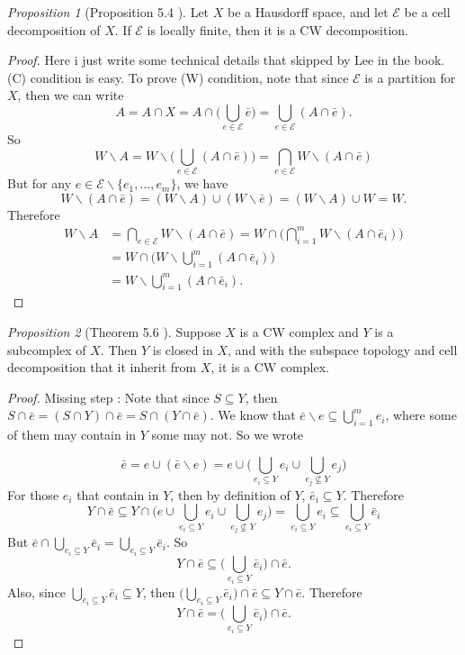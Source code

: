 \documentclass[a4paper]{article}
\theoremstyle{remark}
\newtheorem{prop}{Proposition}
\newcommand{\subhim}{\subseteq} %
\begin{document}
\begin{prop}[Proposition 5.4 \cite{LeeTM}]
	Let $X$ be a Hausdorff space, and let $\mathcal{E}$ be a cell decomposition of $X$. If $\mathcal{E} $ is locally finite, then it is a CW decomposition.
\end{prop}
\begin{proof}
	Here i just write some technical details that skipped by Lee in the book. (C) condition is easy. To prove (W) condition, note that since $\mathcal{E}$ is a partition for $X$, then we can write 
	$$
	A = A \cap X = A \cap \big(\bigcup_{e \in \mathcal{E}} \bar{e}\big) = \bigcup_{e \in \mathcal{E}} (A \cap \bar{e}).  
	$$
	So 
	$$
	W \smallsetminus A = W \smallsetminus \big( \bigcup_{e \in \mathcal{E}} (A \cap \bar{e}) \big) = \bigcap_{e \in \mathcal{E}} W\smallsetminus (A \cap \bar{e})  
	$$
    But for any $e \in \mathcal{E}\smallsetminus \{e_1,\dots,e_m \}$, we have 
    $$
    W \smallsetminus (A \cap \bar{e}) = (W \smallsetminus A) \cup (W \smallsetminus \bar{e}) = (W \smallsetminus A) \cup W = W.
    $$
    Therefore
    \begin{align*}
    W \smallsetminus A &= \bigcap_{e \in \mathcal{E}} W\smallsetminus (A \cap \bar{e}) = W \cap \big( \bigcap_{i=1}^{m} W\smallsetminus (A \cap \bar{e}_i) \big)\\ &= W \cap  \big( W \smallsetminus \bigcup_{i=1}^m (A \cap \bar{e}_i) \big) \\ &=  W \smallsetminus \bigcup_{i=1}^m (A \cap \bar{e}_i).
    \end{align*}
\end{proof}

\begin{prop}[Theorem 5.6 \cite{LeeTM}]
	Suppose $X$ is a CW complex and $Y$ is a subcomplex of $X$. Then $Y$ is closed in $X$, and with the subspace topology and cell decomposition that it inherit from $X$, it is a CW complex.
\end{prop}
\begin{proof}
	Missing step : Note that since $S \subhim Y$, then $S \cap \bar{e} = (S \cap Y) \cap \bar{e} = S \cap (Y \cap \bar{e})$. We know that $\bar{e}\smallsetminus e \subhim \bigcup_{i=1}^m e_i$, where some of them may contain in $Y$ some may not. So we wrote
	
	$$\bar{e} = e \cup (\bar{e}\smallsetminus e) = e \cup \big( \bigcup_{e_i \subhim Y} e_i \cup \bigcup_{e_j \nsubseteq Y} e_j  \big)$$
	For those $e_i$ that contain in $Y$, then by definition of $Y$, $\bar{e}_i \subhim Y$. Therefore
	$$
	Y \cap \bar{e} \subhim Y \cap \Big( e \cup \bigcup_{e_i \subhim Y} e_i \cup \bigcup_{e_j \nsubseteq Y} e_j  \Big)  =  \bigcup_{e_i \subhim Y} e_i \subhim  \bigcup_{e_i \subhim Y} \bar{e}_i
	$$
	But $\bar{e} \cap \bigcup_{e_i \subhim Y} \bar{e}_i = \bigcup_{e_i \subhim Y} \bar{e}_i$. So
	$$
	Y \cap \bar{e} \subhim  \big( \bigcup_{e_i \subhim Y} \bar{e}_i \big) \cap \bar{e}.
	$$ 
	Also, since $\bigcup_{e_i \subhim Y} \bar{e}_i \subhim Y$, then $\Big( \bigcup_{e_i \subhim Y} \bar{e}_i \Big) \cap \bar{e} \subhim Y \cap \bar{e}$. Therefore
	$$
	Y \cap \bar{e} =  \big( \bigcup_{e_i \subhim Y} \bar{e}_i \big) \cap \bar{e}.
	$$
\end{proof}
\end{document}
